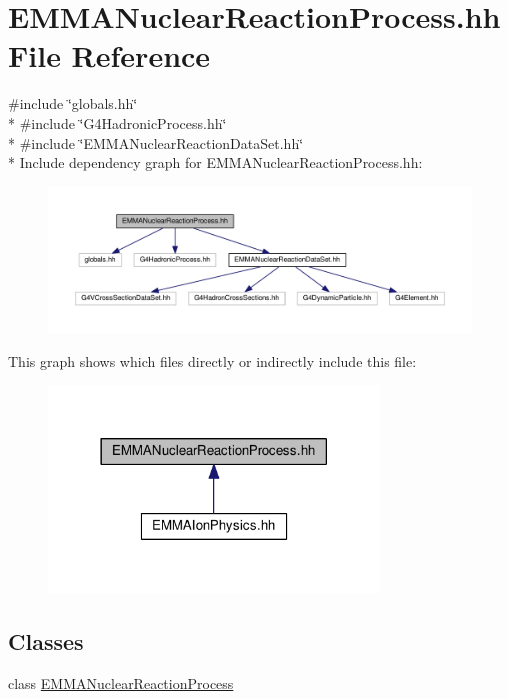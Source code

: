 \hypertarget{EMMANuclearReactionProcess_8hh}{}\section{E\+M\+M\+A\+Nuclear\+Reaction\+Process.\+hh File Reference}
\label{EMMANuclearReactionProcess_8hh}
{\ttfamily \#include \char`\"{}globals.\+hh\char`\"{}}\\*
{\ttfamily \#include \char`\"{}G4\+Hadronic\+Process.\+hh\char`\"{}}\\*
{\ttfamily \#include \char`\"{}E\+M\+M\+A\+Nuclear\+Reaction\+Data\+Set.\+hh\char`\"{}}\\*
Include dependency graph for E\+M\+M\+A\+Nuclear\+Reaction\+Process.\+hh\+:
\nopagebreak
\begin{figure}[H]
\begin{center}
\leavevmode
\includegraphics[width=350pt]{EMMANuclearReactionProcess_8hh__incl}
\end{center}
\end{figure}
This graph shows which files directly or indirectly include this file\+:
\nopagebreak
\begin{figure}[H]
\begin{center}
\leavevmode
\includegraphics[width=249pt]{EMMANuclearReactionProcess_8hh__dep__incl}
\end{center}
\end{figure}
\subsection*{Classes}
\begin{DoxyCompactItemize}
\item 
class \hyperlink{classEMMANuclearReactionProcess}{E\+M\+M\+A\+Nuclear\+Reaction\+Process}
\end{DoxyCompactItemize}
